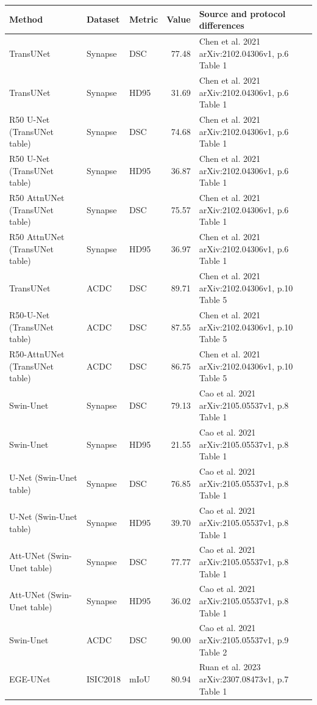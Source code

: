 \begin{tabular}{p{3.2cm}p{2.4cm}p{2.2cm}rp{5.2cm}}
\toprule
Method & Dataset & Metric & Value & Source and protocol differences \\
\midrule
TransUNet & Synapse & DSC & 77.48 & Chen et al. 2021 arXiv:2102.04306v1, p.6 Table 1 \\
TransUNet & Synapse & HD95 & 31.69 & Chen et al. 2021 arXiv:2102.04306v1, p.6 Table 1 \\
R50 U-Net (TransUNet table) & Synapse & DSC & 74.68 & Chen et al. 2021 arXiv:2102.04306v1, p.6 Table 1 \\
R50 U-Net (TransUNet table) & Synapse & HD95 & 36.87 & Chen et al. 2021 arXiv:2102.04306v1, p.6 Table 1 \\
R50 AttnUNet (TransUNet table) & Synapse & DSC & 75.57 & Chen et al. 2021 arXiv:2102.04306v1, p.6 Table 1 \\
R50 AttnUNet (TransUNet table) & Synapse & HD95 & 36.97 & Chen et al. 2021 arXiv:2102.04306v1, p.6 Table 1 \\
TransUNet & ACDC & DSC & 89.71 & Chen et al. 2021 arXiv:2102.04306v1, p.10 Table 5 \\
R50-U-Net (TransUNet table) & ACDC & DSC & 87.55 & Chen et al. 2021 arXiv:2102.04306v1, p.10 Table 5 \\
R50-AttnUNet (TransUNet table) & ACDC & DSC & 86.75 & Chen et al. 2021 arXiv:2102.04306v1, p.10 Table 5 \\
Swin-Unet & Synapse & DSC & 79.13 & Cao et al. 2021 arXiv:2105.05537v1, p.8 Table 1 \\
Swin-Unet & Synapse & HD95 & 21.55 & Cao et al. 2021 arXiv:2105.05537v1, p.8 Table 1 \\
U-Net (Swin-Unet table) & Synapse & DSC & 76.85 & Cao et al. 2021 arXiv:2105.05537v1, p.8 Table 1 \\
U-Net (Swin-Unet table) & Synapse & HD95 & 39.70 & Cao et al. 2021 arXiv:2105.05537v1, p.8 Table 1 \\
Att-UNet (Swin-Unet table) & Synapse & DSC & 77.77 & Cao et al. 2021 arXiv:2105.05537v1, p.8 Table 1 \\
Att-UNet (Swin-Unet table) & Synapse & HD95 & 36.02 & Cao et al. 2021 arXiv:2105.05537v1, p.8 Table 1 \\
Swin-Unet & ACDC & DSC & 90.00 & Cao et al. 2021 arXiv:2105.05537v1, p.9 Table 2 \\
EGE-UNet & ISIC2018 & mIoU & 80.94 & Ruan et al. 2023 arXiv:2307.08473v1, p.7 Table 1 \\

\end{tabular}
